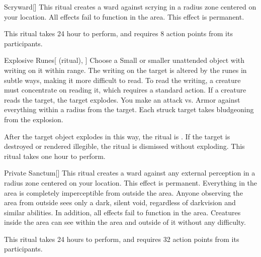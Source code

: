 \lowercase{\hypertarget{spell:Scryward}{}}\label{spell:Scryward}
\begin{apability}[\nth{2}]{\hypertarget{spell:Scryward}{Scryward}}[]
This ritual creates a ward against scrying in a \arealarge radius zone centered on your location.
All  effects fail to function in the area.
This effect is permanent.

This ritual takes 24 hour to perform, and requires 8 action points from its participants.
\end{apability}
\vspace{0.25em}



\lowercase{\hypertarget{spell:Explosive Runes}{}}\label{spell:Explosive Runes}
\begin{attuneability}[\nth{3}]{\hypertarget{spell:Explosive Runes}{Explosive Runes}}[ (ritual), ]
Choose a Small or smaller unattended object with writing on it within \rngclose range.
The writing on the target is altered by the runes in subtle ways, making it more difficult to read.
To read the writing, a creature must concentrate on reading it, which requires a standard action.
If a creature reads the target, the target explodes.
You make an attack vs. Armor against everything within a \areamed radius from the target.
Each struck target takes bludgeoning  from the explosion.

After the target object explodes in this way, the ritual is .
If the target is destroyed or rendered illegible, the ritual is dismissed without exploding.
This ritual takes one hour to perform.
\end{attuneability}
\vspace{0.25em}



\lowercase{\hypertarget{spell:Private Sanctum}{}}\label{spell:Private Sanctum}
\begin{apability}[\nth{4}]{\hypertarget{spell:Private Sanctum}{Private Sanctum}}[]
This ritual creates a ward against any external perception in a \arealarge radius zone centered on your location.
This effect is permanent.
Everything in the area is completely imperceptible from outside the area.
Anyone observing the area from outside sees only a dark, silent void, regardless of darkvision and similar abilities.
In addition, all  effects fail to function in the area.
Creatures inside the area can see within the area and outside of it without any difficulty.

This ritual takes 24 hours to perform, and requires 32 action points from its participants.
\end{apability}
\vspace{0.25em}



